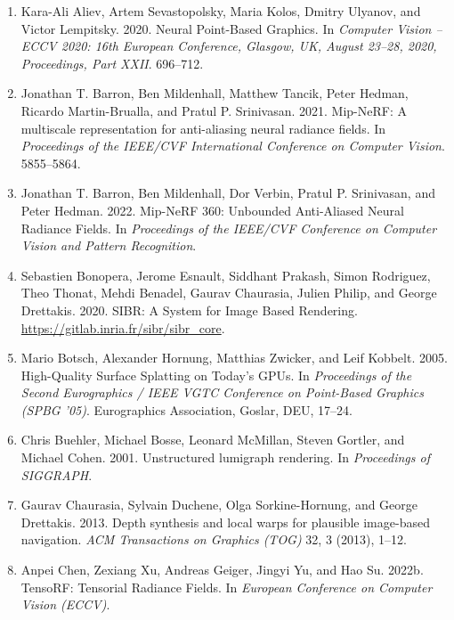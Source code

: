 \begingroup
\small
\sloppy
\begin{enumerate}[leftmargin=2em, itemsep=0.3em, topsep=0.4em, parsep=0pt]
    \item Kara-Ali Aliev, Artem Sevastopolsky, Maria Kolos, Dmitry Ulyanov, and Victor Lempitsky. 2020. Neural Point-Based Graphics. In \textit{Computer Vision -- ECCV 2020: 16th European Conference, Glasgow, UK, August 23--28, 2020, Proceedings, Part XXII}. 696--712.

    \item Jonathan T. Barron, Ben Mildenhall, Matthew Tancik, Peter Hedman, Ricardo Martin-Brualla, and Pratul P. Srinivasan. 2021. Mip-NeRF: A multiscale representation for anti-aliasing neural radiance fields. In \textit{Proceedings of the IEEE/CVF International Conference on Computer Vision}. 5855--5864.

    \item Jonathan T. Barron, Ben Mildenhall, Dor Verbin, Pratul P. Srinivasan, and Peter Hedman. 2022. Mip-NeRF 360: Unbounded Anti-Aliased Neural Radiance Fields. In \textit{Proceedings of the IEEE/CVF Conference on Computer Vision and Pattern Recognition}.

    \item Sebastien Bonopera, Jerome Esnault, Siddhant Prakash, Simon Rodriguez, Theo Thonat, Mehdi Benadel, Gaurav Chaurasia, Julien Philip, and George Drettakis. 2020. SIBR: A System for Image Based Rendering. \url{https://gitlab.inria.fr/sibr/sibr_core}.

    \item Mario Botsch, Alexander Hornung, Matthias Zwicker, and Leif Kobbelt. 2005. High-Quality Surface Splatting on Today's GPUs. In \textit{Proceedings of the Second Eurographics / IEEE VGTC Conference on Point-Based Graphics (SPBG '05)}. Eurographics Association, Goslar, DEU, 17--24.

    \item Chris Buehler, Michael Bosse, Leonard McMillan, Steven Gortler, and Michael Cohen. 2001. Unstructured lumigraph rendering. In \textit{Proceedings of SIGGRAPH}.

    \item Gaurav Chaurasia, Sylvain Duchene, Olga Sorkine-Hornung, and George Drettakis. 2013. Depth synthesis and local warps for plausible image-based navigation. \textit{ACM Transactions on Graphics (TOG)} 32, 3 (2013), 1--12.

    \item Anpei Chen, Zexiang Xu, Andreas Geiger, Jingyi Yu, and Hao Su. 2022b. TensoRF: Tensorial Radiance Fields. In \textit{European Conference on Computer Vision (ECCV)}.


\end{enumerate}
